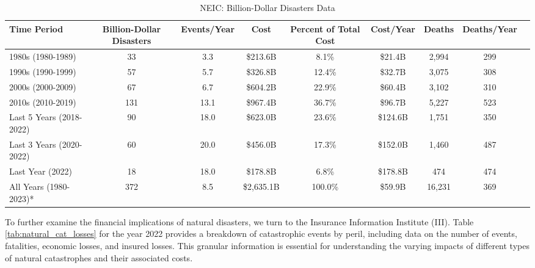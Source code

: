 \documentclass[12pt]{article}
\begin{document}
\begin{table}[h]
  \label{tab:bil_dol_disasters} 
    \centering
    \begin{tabular}{|l|c|c|c|c|c|c|c|c|}
        \hline
        Time Period & Billion-Dollar Disasters & Events/Year & Cost & Percent of Total Cost & Cost/Year & Deaths & Deaths/Year \\
        \hline
        1980s (1980-1989) & 33 & 3.3 & \$213.6B & 8.1\% & \$21.4B & 2,994 & 299 \\
        1990s (1990-1999) & 57 & 5.7 & \$326.8B & 12.4\% & \$32.7B & 3,075 & 308 \\
        2000s (2000-2009) & 67 & 6.7 & \$604.2B & 22.9\% & \$60.4B & 3,102 & 310 \\
        2010s (2010-2019) & 131 & 13.1 & \$967.4B & 36.7\% & \$96.7B & 5,227 & 523 \\
        Last 5 Years (2018-2022) & 90 & 18.0 & \$623.0B & 23.6\% & \$124.6B & 1,751 & 350 \\
        Last 3 Years (2020-2022) & 60 & 20.0 & \$456.0B & 17.3\% & \$152.0B & 1,460 & 487 \\
        Last Year (2022) & 18 & 18.0 & \$178.8B & 6.8\% & \$178.8B & 474 & 474 \\
        All Years (1980-2023)* & 372 & 8.5 & \$2,635.1B & 100.0\% & \$59.9B & 16,231 & 369 \\
        \hline
    \end{tabular}
    \caption{NEIC: Billion-Dollar Disasters Data}
    \cite{ncei}
\end{table}

To further examine the financial implications of natural disasters, we turn to the Insurance Information Institute (III)\cite{iii}. 
Table \ref{tab:natural_cat_losses} for the year 2022 provides a breakdown of catastrophic events by peril, including data on the 
number of events, fatalities, economic losses, and insured losses. This granular information is essential for understanding the 
varying impacts of different types of natural catastrophes and their associated costs.
\end{document}
